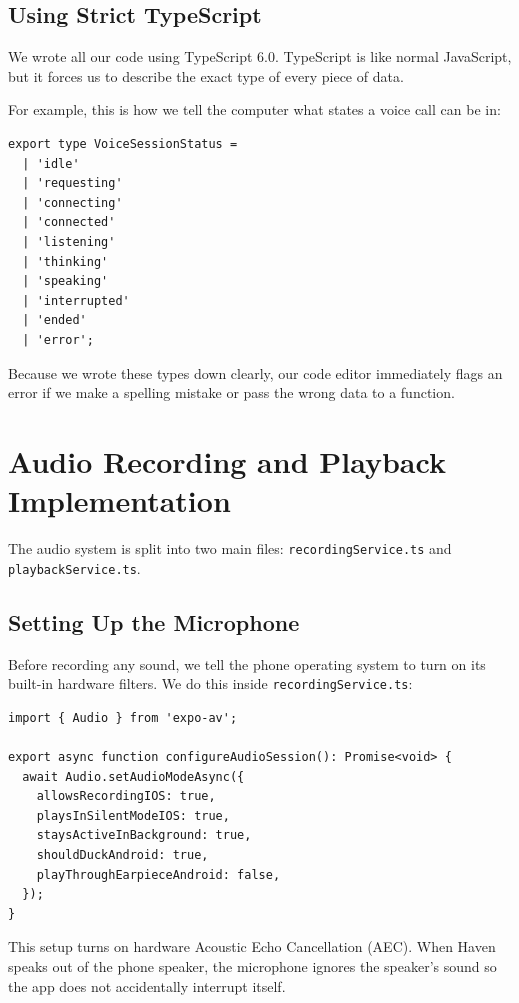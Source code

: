 \subsection{Using Strict TypeScript}
We wrote all our code using TypeScript 6.0. TypeScript is like normal JavaScript, but it forces us to describe the exact type of every piece of data. 

For example, this is how we tell the computer what states a voice call can be in:
\begin{verbatim}
export type VoiceSessionStatus = 
  | 'idle' 
  | 'requesting' 
  | 'connecting' 
  | 'connected' 
  | 'listening' 
  | 'thinking' 
  | 'speaking' 
  | 'interrupted' 
  | 'ended' 
  | 'error';
\end{verbatim}
Because we wrote these types down clearly, our code editor immediately flags an error if we make a spelling mistake or pass the wrong data to a function.

\section{Audio Recording and Playback Implementation}
\label{sec:impl_audio}

The audio system is split into two main files: \texttt{recordingService.ts} and \texttt{playbackService.ts}.

\subsection{Setting Up the Microphone}
Before recording any sound, we tell the phone operating system to turn on its built-in hardware filters. We do this inside \texttt{recordingService.ts}:
\begin{verbatim}
import { Audio } from 'expo-av';

export async function configureAudioSession(): Promise<void> {
  await Audio.setAudioModeAsync({
    allowsRecordingIOS: true,
    playsInSilentModeIOS: true,
    staysActiveInBackground: true,
    shouldDuckAndroid: true,
    playThroughEarpieceAndroid: false,
  });
}
\end{verbatim}
This setup turns on hardware Acoustic Echo Cancellation (AEC). When Haven speaks out of the phone speaker, the microphone ignores the speaker's sound so the app does not accidentally interrupt itself.

